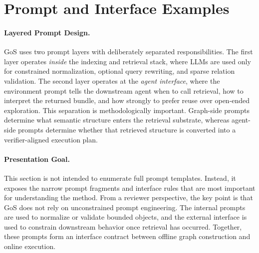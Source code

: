 \section{Prompt and Interface Examples}

\paragraph{Layered Prompt Design.}
GoS uses two prompt layers with deliberately separated responsibilities. The first layer operates \emph{inside} the indexing and retrieval stack, where LLMs are used only for constrained normalization, optional query rewriting, and sparse relation validation. The second layer operates at the \emph{agent interface}, where the environment prompt tells the downstream agent when to call retrieval, how to interpret the returned bundle, and how strongly to prefer reuse over open-ended exploration. This separation is methodologically important. Graph-side prompts determine what semantic structure enters the retrieval substrate, whereas agent-side prompts determine whether that retrieved structure is converted into a verifier-aligned execution plan.

\paragraph{Presentation Goal.}
This section is not intended to enumerate full prompt templates. Instead, it exposes the narrow prompt fragments and interface rules that are most important for understanding the method. From a reviewer perspective, the key point is that GoS does not rely on unconstrained prompt engineering. The internal prompts are used to normalize or validate bounded objects, and the external interface is used to constrain downstream behavior once retrieval has occurred. Together, these prompts form an interface contract between offline graph construction and online execution.

